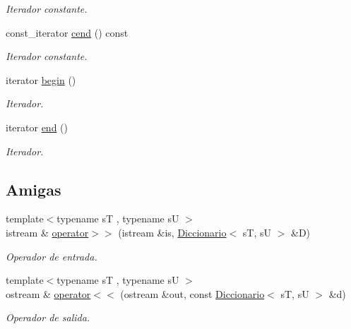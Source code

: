 \begin{DoxyCompactItemize}
\begin{DoxyCompactList}\small\item\em Iterador constante. \end{DoxyCompactList}\item 
const\+\_\+iterator \hyperlink{classDiccionario_ac4e5b5c7800bf3df103ca6b58f118598}{cend} () const
\begin{DoxyCompactList}\small\item\em Iterador constante. \end{DoxyCompactList}\item 
iterator \hyperlink{classDiccionario_aa17ce3d7317d78f5927ae7c0564089cc}{begin} ()
\begin{DoxyCompactList}\small\item\em Iterador. \end{DoxyCompactList}\item 
iterator \hyperlink{classDiccionario_adb5cdbfce59b4005bd07473273df3a8e}{end} ()
\begin{DoxyCompactList}\small\item\em Iterador. \end{DoxyCompactList}\end{DoxyCompactItemize}
\subsection*{Amigas}
\begin{DoxyCompactItemize}
\item 
{\footnotesize template$<$typename sT , typename sU $>$ }\\istream \& \hyperlink{classDiccionario_a2313add83e8a854c86c6cff6aee5b019}{operator$>$$>$} (istream \&is, \hyperlink{classDiccionario}{Diccionario}$<$ sT, sU $>$ \&D)
\begin{DoxyCompactList}\small\item\em Operador de entrada. \end{DoxyCompactList}\item 
{\footnotesize template$<$typename sT , typename sU $>$ }\\ostream \& \hyperlink{classDiccionario_a17e088cf1beb9832aaef7ecbbe2bd79a}{operator$<$$<$} (ostream \&out, const \hyperlink{classDiccionario}{Diccionario}$<$ sT, sU $>$ \&d)
\begin{DoxyCompactList}\small\item\em Operador de salida. \end{DoxyCompactList}\end{DoxyCompactItemize}


